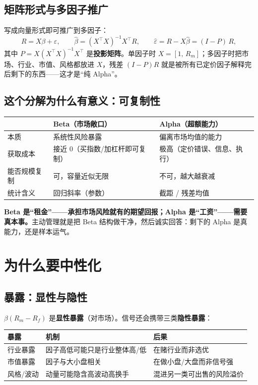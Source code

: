 \documentclass[UTF8,11pt]{ctexart}
\begin{document}
\subsection{矩阵形式与多因子推广}
写成向量形式即可推广到多因子：
\begin{equation}
R = X\beta + \varepsilon,
\qquad
\hat\beta = (X^{\top}X)^{-1}X^{\top}R,
\qquad
\hat\varepsilon = R-X\hat\beta = (I-P)\,R,
\end{equation}
其中 $P=X(X^{\top}X)^{-1}X^{\top}$ 是\textbf{投影矩阵}。单因子时 $X=[1,\,R_m]$；多因子时把市场、行业、市值、风格都放进 $X$，残差 $(I-P)R$ 就是被所有已定价因子解释完后剩下的东西——这才是“纯 Alpha”。

\subsection{这个分解为什么有意义：可复制性}
\begin{center}
\renewcommand{\arraystretch}{1.4}
\begin{tabular}{@{}l>{\raggedright\arraybackslash}p{4.2cm}>{\raggedright\arraybackslash}p{4.2cm}@{}}
\toprule
 & \textbf{Beta（市场敞口）} & \textbf{Alpha（超额能力）} \\
\midrule
本质 & 系统性风险暴露 & 偏离市场均值的能力 \\
获取成本 & 接近 0（买指数/加杠杆即可复制） & 极高（定价错误、信息、执行） \\
能否规模复制 & 可，容量近似无限 & 不可，越大越衰减 \\
统计含义 & 回归斜率（参数） & 截距 / 残差均值 \\
\bottomrule
\end{tabular}
\end{center}

\textbf{Beta 是“租金”——承担市场风险就有的期望回报；Alpha 是“工资”——需要真本事。}主动管理就是把 Beta 结构做干净，然后诚实回答：剩下的 Alpha 是真能力，还是样本运气。

\section{为什么要中性化}

\subsection{暴露：显性与隐性}
$\beta(R_m-R_f)$ 是\textbf{显性暴露}（对市场）。信号还会携带三类\textbf{隐性暴露}：

\begin{center}
\renewcommand{\arraystretch}{1.4}
\begin{tabular}{@{}lll@{}}
\toprule
暴露 & 机制 & 后果 \\
\midrule
行业暴露 & 因子高低可能只是行业整体高/低 & 在赌行业而非选优 \\
市值暴露 & 因子与大小盘相关 & 在做小盘/大盘而非信号强 \\
风格/波动 & 动量可能隐含高波动高换手 & 混进另一类可出售的风险溢价 \\
\bottomrule
\end{tabular}
\end{center}
\end{document}
